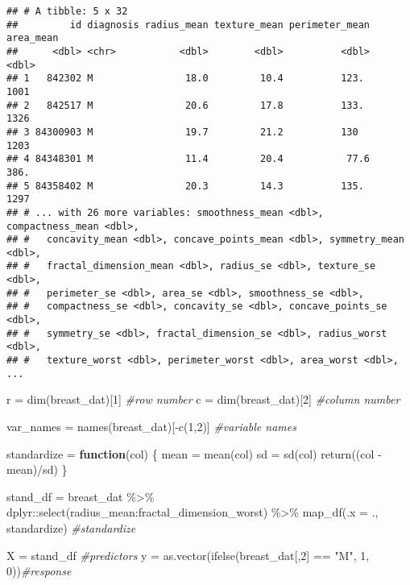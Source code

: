 \documentclass[
]{article}
\newenvironment{Shaded}{\begin{snugshade}}{\end{snugshade}}
\newcommand{\AttributeTok}[1]{\textcolor[rgb]{0.77,0.63,0.00}{#1}}
\newcommand{\CommentTok}[1]{\textcolor[rgb]{0.56,0.35,0.01}{\textit{#1}}}
\newcommand{\ControlFlowTok}[1]{\textcolor[rgb]{0.13,0.29,0.53}{\textbf{#1}}}
\newcommand{\DecValTok}[1]{\textcolor[rgb]{0.00,0.00,0.81}{#1}}
\newcommand{\FunctionTok}[1]{\textcolor[rgb]{0.00,0.00,0.00}{#1}}
\newcommand{\NormalTok}[1]{#1}
\newcommand{\OtherTok}[1]{\textcolor[rgb]{0.56,0.35,0.01}{#1}}
\newcommand{\SpecialCharTok}[1]{\textcolor[rgb]{0.00,0.00,0.00}{#1}}
\newcommand{\StringTok}[1]{\textcolor[rgb]{0.31,0.60,0.02}{#1}}
\begin{document}
\begin{verbatim}
## # A tibble: 5 x 32
##         id diagnosis radius_mean texture_mean perimeter_mean area_mean
##      <dbl> <chr>           <dbl>        <dbl>          <dbl>     <dbl>
## 1   842302 M                18.0         10.4          123.      1001 
## 2   842517 M                20.6         17.8          133.      1326 
## 3 84300903 M                19.7         21.2          130       1203 
## 4 84348301 M                11.4         20.4           77.6      386.
## 5 84358402 M                20.3         14.3          135.      1297 
## # ... with 26 more variables: smoothness_mean <dbl>, compactness_mean <dbl>,
## #   concavity_mean <dbl>, concave_points_mean <dbl>, symmetry_mean <dbl>,
## #   fractal_dimension_mean <dbl>, radius_se <dbl>, texture_se <dbl>,
## #   perimeter_se <dbl>, area_se <dbl>, smoothness_se <dbl>,
## #   compactness_se <dbl>, concavity_se <dbl>, concave_points_se <dbl>,
## #   symmetry_se <dbl>, fractal_dimension_se <dbl>, radius_worst <dbl>,
## #   texture_worst <dbl>, perimeter_worst <dbl>, area_worst <dbl>, ...
\end{verbatim}

\begin{Shaded}
\begin{Highlighting}[]
\NormalTok{r }\OtherTok{=} \FunctionTok{dim}\NormalTok{(breast\_dat)[}\DecValTok{1}\NormalTok{] }\CommentTok{\#row number}
\NormalTok{c }\OtherTok{=} \FunctionTok{dim}\NormalTok{(breast\_dat)[}\DecValTok{2}\NormalTok{] }\CommentTok{\#column number}

\NormalTok{var\_names }\OtherTok{=} \FunctionTok{names}\NormalTok{(breast\_dat)[}\SpecialCharTok{{-}}\FunctionTok{c}\NormalTok{(}\DecValTok{1}\NormalTok{,}\DecValTok{2}\NormalTok{)] }\CommentTok{\#variable names}
  
\NormalTok{standardize }\OtherTok{=} \ControlFlowTok{function}\NormalTok{(col) \{}
\NormalTok{  mean }\OtherTok{=} \FunctionTok{mean}\NormalTok{(col)}
\NormalTok{  sd }\OtherTok{=} \FunctionTok{sd}\NormalTok{(col)}
  \FunctionTok{return}\NormalTok{((col }\SpecialCharTok{{-}}\NormalTok{ mean)}\SpecialCharTok{/}\NormalTok{sd)}
\NormalTok{\}}

\NormalTok{stand\_df }\OtherTok{=}\NormalTok{ breast\_dat }\SpecialCharTok{\%\textgreater{}\%} 
\NormalTok{  dplyr}\SpecialCharTok{::}\FunctionTok{select}\NormalTok{(radius\_mean}\SpecialCharTok{:}\NormalTok{fractal\_dimension\_worst) }\SpecialCharTok{\%\textgreater{}\%} 
  \FunctionTok{map\_df}\NormalTok{(}\AttributeTok{.x =}\NormalTok{ ., standardize) }\CommentTok{\#standardize}

\NormalTok{X }\OtherTok{=}\NormalTok{ stand\_df }\CommentTok{\#predictors}
\NormalTok{y }\OtherTok{=} \FunctionTok{as.vector}\NormalTok{(}\FunctionTok{ifelse}\NormalTok{(breast\_dat[,}\DecValTok{2}\NormalTok{] }\SpecialCharTok{==} \StringTok{"M"}\NormalTok{, }\DecValTok{1}\NormalTok{, }\DecValTok{0}\NormalTok{))}\CommentTok{\#response}
\end{Highlighting}
\end{Shaded}
\end{document}
